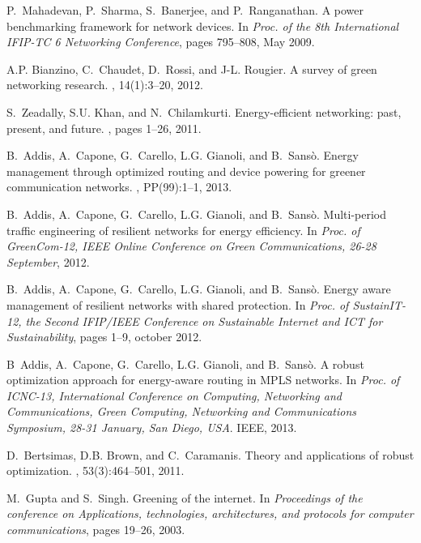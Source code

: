 \documentclass[final,5p,times,twocolumn]{elsarticle}
\begin{document}
\begin{thebibliography}{10}
P.~Mahadevan, P.~Sharma, S.~Banerjee, and P.~Ranganathan.
\newblock A power benchmarking framework for network devices.
\newblock In {\em Proc. of the 8th International {IFIP-TC} 6 Networking
  Conference}, pages 795--808, May 2009.

A.P. Bianzino, C.~Chaudet, D.~Rossi, and J-L. Rougier.
\newblock A survey of green networking research.
, 14(1):3--20, 2012.

S.~Zeadally, S.U. Khan, and N.~Chilamkurti.
\newblock Energy-efficient networking: past, present, and future.
, pages 1--26, 2011.

B.~Addis, A.~Capone, G.~Carello, L.G. Gianoli, and B.~Sans\`o.
\newblock Energy management through optimized routing and device powering for
  greener communication networks.
, PP(99):1--1, 2013.

B.~Addis, A.~Capone, G.~Carello, L.G. Gianoli, and B.~Sans\`o.
\newblock Multi-period traffic engineering of resilient networks for energy
  efficiency.
\newblock In {\em Proc. of GreenCom-12, IEEE Online Conference on Green
  Communications, 26-28 September}, 2012.

B.~Addis, A.~Capone, G.~Carello, L.G. Gianoli, and B.~Sans\`o.
\newblock Energy aware management of resilient networks with shared protection.
\newblock In {\em Proc. of SustainIT-12, the Second IFIP/IEEE Conference on
  Sustainable Internet and ICT for Sustainability}, pages 1--9, october 2012.

B~Addis, A.~Capone, G.~Carello, L.G. Gianoli, and B.~Sans\`o.
\newblock A robust optimization approach for energy-aware routing in {MPLS}
  networks.
\newblock In {\em Proc. of ICNC-13, International Conference on Computing,
  Networking and Communications, Green Computing, Networking and Communications
  Symposium, 28-31 January, San Diego, USA}. IEEE, 2013.

D.~Bertsimas, D.B. Brown, and C.~Caramanis.
\newblock Theory and applications of robust optimization.
, 53(3):464--501, 2011.

M.~Gupta and S.~Singh.
\newblock Greening of the internet.
\newblock In {\em Proceedings of the conference on Applications, technologies,
  architectures, and protocols for computer communications}, pages 19--26,
  2003.


\end{thebibliography}
\end{document}
